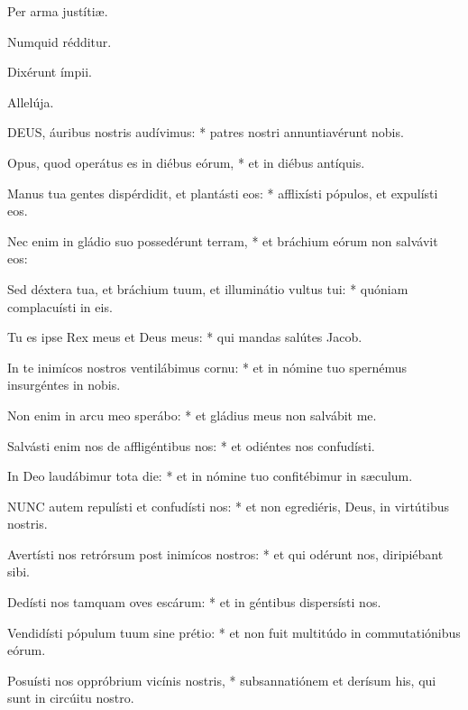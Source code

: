 

 Per arma justítiæ.


 Numquid rédditur.


 Dixérunt ímpii.

  Allelúja.


\lettrine[lines=2]{D}{EUS}, áuribus nostris audívimus: * patres nostri annuntiavérunt nobis.

Opus, quod operátus es in diébus eórum, * et in diébus antíquis.

Manus tua gentes dispérdidit, et plantásti eos: * afflixísti pópulos, et expulísti eos.

Nec enim in gládio suo possedérunt terram, * et bráchium eórum non salvávit eos:

Sed déxtera tua, et bráchium tuum, et illuminátio vultus tui: * quóniam complacuísti in eis.

Tu es ipse Rex meus et Deus meus: * qui mandas salútes Jacob.

In te inimícos nostros ventilábimus cornu: * et in nómine tuo spernémus insurgéntes in nobis.

Non enim in arcu meo sperábo: * et gládius meus non salvábit me.

Salvásti enim nos de affligéntibus nos: * et odiéntes nos confudísti.

In Deo laudábimur tota die: * et in nómine tuo confitébimur in sæculum.


\lettrine[lines=2]{N}{UNC} autem repulísti et confudísti nos: * et non egrediéris, Deus, in virtútibus nostris.

Avertísti nos retrórsum post inimícos nostros: * et qui odérunt nos, diripiébant sibi.

Dedísti nos tamquam oves escárum: * et in géntibus dispersísti nos.

Vendidísti pópulum tuum sine prétio: * et non fuit multitúdo in commutatiónibus eórum.

Posuísti nos oppróbrium vicínis nostris, * subsannatiónem et derísum his, qui sunt in circúitu nostro.

